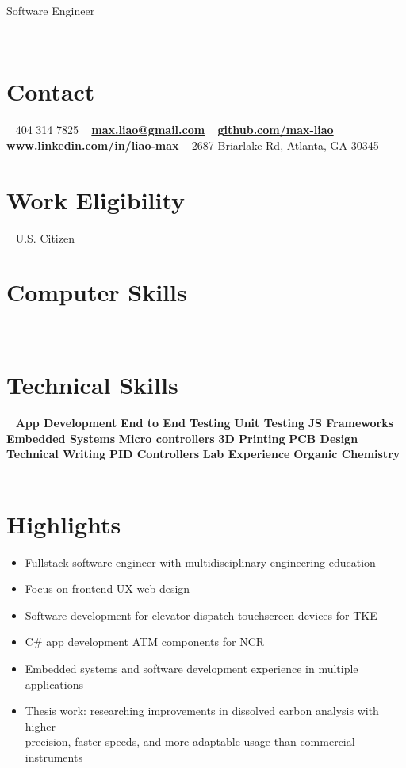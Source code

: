 \documentclass[]{resume}
\begin{document}
{Software Engineer}\\

\begin{aside}
	~
	~
	~
	~
	~
	~
	\section{Contact}
	~
	404 314 7825
	~
	\href{mailto:max.liao@gmail.com}{\textbf{max.liao@gmail.com}}
	~
	\href{github.com/max-liao}{\textbf{github.com/max-liao}}
	~
	\href{www.linkedin.com/in/liao-max}{\textbf{\scriptsize www.linkedin.com/in/liao-max}}
	~
	{\small 2687 Briarlake Rd, Atlanta, GA 30345}
	~
	\section{\large Work Eligibility}
	~
	U.S. Citizen
	~
	\section{\large Computer Skills}
	~
	~
	\section{\large Technical Skills}
	~
	\textbf{App Development}
	\textbf{End to End Testing}
	\textbf{Unit Testing}
	\textbf{JS Frameworks}
	\textbf{Embedded Systems}
	\textbf{Micro controllers}
	\textbf{3D Printing}
	\textbf{PCB Design}
	\textbf{Technical Writing}
	\textbf{PID Controllers}
	\textbf{Lab Experience}
	\textbf{Organic Chemistry}
	~
\end{aside}

\section{Highlights}
\begin{itemize}
	\item {Fullstack software engineer with multidisciplinary engineering education}
	\item {Focus on frontend UX web design}
	\item {Software development for elevator dispatch touchscreen devices for TKE}
	\item {C\# app development ATM components for NCR}
	\item {Embedded systems and software development experience in multiple applications}
	\item {Thesis work: researching improvements in dissolved carbon analysis with higher \\precision, faster speeds, and more adaptable usage than commercial instruments}
\end{itemize}
~
\end{document}
